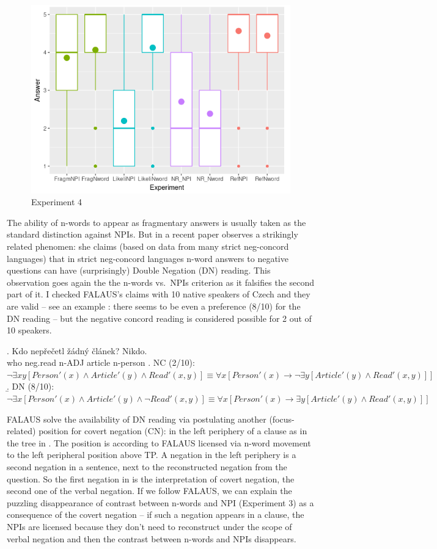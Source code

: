 \documentclass[12pt]{scrartcl}
\begin{document}
\begin{figure}
\centering
\includegraphics{include/Rplot04.png}
\caption{Experiment 4}
\end{figure}

The ability of n-words to appear as fragmentary answers is usually taken as the standard distinction against NPIs. But in a recent paper  \cite{fualuaus2016fragment} observes a strikingly related phenomen: she claims (based on data from many strict neg-concord languages) that in strict neg-concord languages n-word answers to negative questions can have (surprisingly) Double Negation (DN) reading. This observation goes again the the n-words vs.~NPIs criterion as it falsifies the second part of it. I checked FALAUS's claims with 10 native speakers of Czech and they are valid -- see an example \Next: there seems to be even a preference (8/10) for the DN reading -- \Next[a] but the negative concord reading \Next[b] is considered possible for 2 out of 10 speakers. 

\ex. Kdo nepřečetl žádný článek? Nikdo.\\
who neg.read n-ADJ article n-person \a. NC (2/10):
\(\neg \exists xy[Person'(x) \wedge Article'(y) \wedge Read'(x,y)] \equiv \forall x[Person'(x) \rightarrow \neg \exists y[Article'(y) \wedge Read'(x,y)]]\)
\b. DN (8/10):
\(\neg \exists x[Person'(x) \wedge  Article'(y) \wedge \neg Read'(x,y)] \equiv\forall x[Person'(x) \rightarrow \exists y[Article'(y) \wedge Read'(x,y)]]\)

FALAUS solve the availability of DN reading via postulating another (focus-related) position for covert negation (CN): in the left periphery of a clause as in the tree in \Next. The position is according to FALAUS licensed via n-word movement to the left peripheral position above TP. A negation in the left periphery is a second negation in a sentence, next to the reconstructed negation from the question. So the first negation in \Last[b] is the interpretation of covert negation, the second one of the verbal negation. If we follow FALAUS, we can explain the puzzling disappearance of contrast between n-words and NPI (Experiment 3) as a consequence of the covert negation -- if such a negation appears in a clause, the NPIs are licensed because they don't need to reconstruct under the scope of verbal negation and then the contrast between n-words and NPIs disappears.
\end{document}
